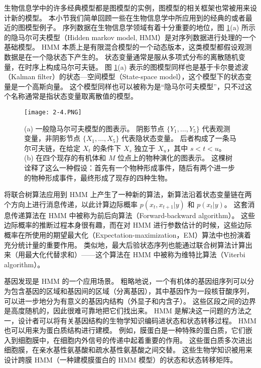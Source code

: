 生物信息学中的许多经典模型都是图模型的实例，图模型的相关框架也常被用来设计新的模型。
本小节我们简单回顾一些在生物信息学中所应用到的经典的或者最近的图模型例子。
序列数据在生物信息学领域有着十分重要的地位，图 \ref{fig:2-4}(a) 所示的隐马尔可夫模型（Hidden markov model, HMM）是对序列数据进行处理的一个基础模型。
HMM 本质上是有限混合模型的一个动态版本，这类模型都假设观测数据是在一个隐状态下产生的。
状态变量通常是服从多项式分布的离散随机变量，在时序上构成马尔可夫链。
图 \ref{fig:2-4}(a) 表示的图模型同样也是基于卡尔曼滤波（Kalman filter）的状态—空间模型（State-space model），这个模型下的状态变量是一个高斯向量。
这个模型同样也可以被称为是“隐马尔可夫模型”，只不过这个名称通常是指状态变量取离散值的模型。

\begin{figure}[htbp]
    \centering
    \texttt{[image: 2-4.PNG]}
    \caption{
        (a) 一般隐马尔可夫模型的图表示。
        阴影节点 $\{Y_1, \dots, Y_5\}$ 代表观测变量，非阴影节点 $\{X_1, \dots, X_5\}$ 代表隐状态变量。
        后者构成了一条马尔可夫链，在给定 $X_t$ 的条件下 $X_s$ 独立于 $X_u$，其中 $s < t < u$。
        (b) 在四个现存的有机体和 $M$ 位点上的物种演化的图表示。
        这棵树诠释了这么一种假设：首先有一个物种形成事件，随后有两个进一步的物种形成事件，最终形成了现存的四种生物。
    }\label{fig:2-4}
\end{figure}

将联合树算法应用到 HMM 上产生了一种新的算法，新算法沿着状态变量链在两个方向上进行消息传递，以此计算边际概率 $p(x_t, x_{t+1}|y)$ 和 $p(x_t|y)$。
这套消息传递算法在 HMM 中被称为前后向算法（Forward-backward algorithm）。
这些边际概率的推断过程本身很有趣，而在对 HMM 进行参数估计的时候，这些边际概率在所使用的期望最大化（Expectation-maximization，EM）算法中也扮演着充分统计量的重要作用。
类似地，最大后验状态序列也能通过联合树算法计算出来（用最大化代替求和）——这个算法在 HMM 中被称为维特比算法（Viterbi algorithm）。

基因发现是 HMM 的一个应用场景。
粗略地说，一个有机体的基因组序列可以分为包含基因的区域和基因间的区域（分离基因），其中基因作为一段核苷酸序列，可以进一步地分为有意义的基因内结构（外显子和内含子）。
这些区段之间的边界是高度随机的，因此很难可靠地把它们找出来。
HMM 是解决这一问题的方法之一，设计者可以将有关基因结构的生物学知识编码进状态和状态转移过程。
HMM 也可以用来为蛋白质结构进行建模。
例如，膜蛋白是一种特殊的蛋白质，它们嵌入到细胞膜中，在细胞内外信号的传递中起着重要的作用。
这些蛋白质多次进出细胞膜，在亲水基性氨基酸和疏水基性氨基酸之间交替。
这些生物学知识被用来设计跨膜 HMM（一种建模膜蛋白的 HMM 模型）的状态和状态转移矩阵。

